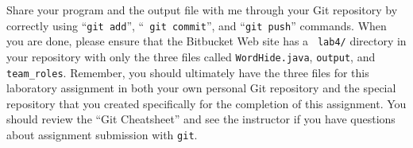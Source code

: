\vspace{-0.1in}

Share your program and the output file with me through your Git repository by correctly using ``{\tt git add}'', ``{\tt
git commit}'', and ``{\tt git push}'' commands. When you are done, please ensure that the Bitbucket Web site has a {\tt
lab4/} directory in your repository with only the three files called {\tt WordHide.java}, {\tt output}, and {\tt
team\_roles}. Remember, you should ultimately have the three files for this laboratory assignment in both your own
personal Git repository and the special repository that you created specifically for the completion of this assignment.
You should review the ``Git Cheatsheet'' and see the instructor if you have questions about assignment submission with
{\tt git}.


